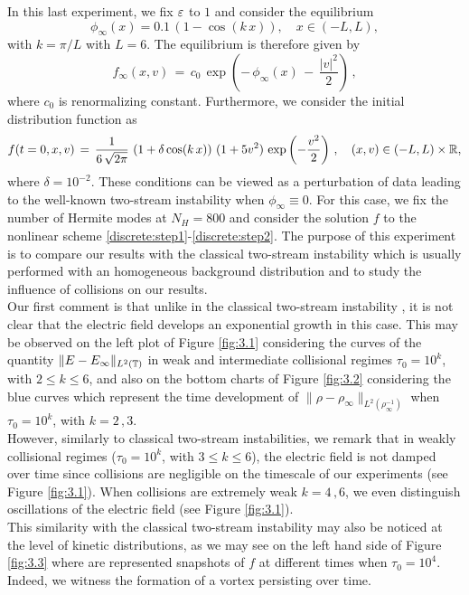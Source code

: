 \documentclass[11pt]{amsart}
\numberwithin{equation}{section}
\numberwithin{figure}{section}
\begin{document}
In this last experiment, we fix $\varepsilon$ to $1$ and consider the equilibrium
$$
\phi_\infty(x) = 0.1\,\left( 1-\cos(k\,x)\right), \quad x \in (-L,L),
$$
with $k=\pi/L$ with $L=6$. The equilibrium is therefore given by 
\[
f_{\infty}(x,v)\,=\,c_0\,\exp\left(-\,\phi_{\infty}(x)\,-\,\frac{|v|^2}{2}\right)\,,
\]
where $c_0$ is renormalizing constant. Furthermore, we consider the initial distribution function as 
$$
f(t=0,x,v) \,=\, \frac{1}{6\,\sqrt{2\pi}}\,\left(1+\delta\cos(k\,x)\right)\, (1+5v^2)
\, \exp\left(-\frac{v^2}{2}\right)\,, \quad (x,v) \in (-L,L)\times {\mathbb R},
$$
where $\delta=10^{-2}$. These conditions can be viewed as a perturbation
of data leading to the well-known two-stream instability when
$\phi_\infty\equiv 0$. For this case, we fix the number of Hermite modes at $N_H=800$ and consider the solution $f$ to the nonlinear scheme \eqref{discrete:step1}-\eqref{discrete:step2}. The purpose of this experiment is to compare our results with the classical two-stream instability which is usually performed with an homogeneous background distribution and to study the influence of collisions on our results.\\
Our first comment is that unlike in the classical two-stream
instability \cite{ref:5}, it is not clear that the electric field
develops an exponential growth in this case. This may be observed on the left plot of Figure \ref{fig:3.1} considering the curves of the quantity $\| E -E_\infty \|_{L^2({\mathbb T})}$ in weak and intermediate collisional regimes $\tau_0=10^k$, with $2\leq k\leq6$, and also on the bottom charts of Figure \ref{fig:3.2} considering the blue curves which represent the time development of $\|\rho-\rho_{\infty}\|_{L^2(\rho_\infty^{-1})}$ when $\tau_0=10^k$, with $k=2\,,3$. \\
However, similarly to classical two-stream instabilities, we remark that in weakly collisional regimes ($\tau_0=10^k$, with $3\leq k\leq6$), the electric field is not damped over time since collisions are negligible on the timescale of our experiments (see Figure \ref{fig:3.1}). When collisions are extremely weak $k=4\,,6$, we even distinguish oscillations of the electric field (see Figure \ref{fig:3.1}). \\
This similarity with the classical two-stream instability may also be noticed at the level of kinetic distributions, as we may see on the left hand side of Figure \ref{fig:3.3} where are represented snapshots of
$f$ at different times when $\tau_0=10^4$. Indeed, we witness the formation of a vortex persisting over time. \\
\end{document}
